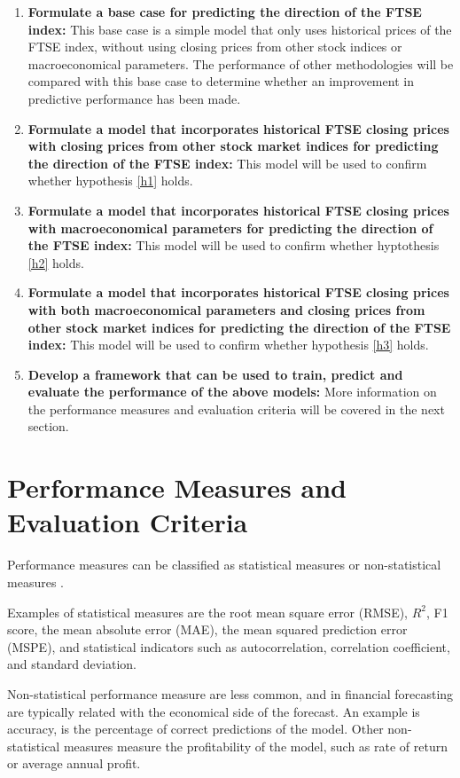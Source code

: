 \documentclass{UoYCSproject}
\begin{document}
\begin{enumerate}
    \item \label{basecase} \textbf{Formulate a base case for predicting the direction of the FTSE index:} This base case is a simple model that only uses historical prices of the FTSE index, without using closing prices from other stock indices or macroeconomical parameters. The performance of other methodologies will be compared with this base case to determine whether an improvement in predictive performance has been made.  
    \item \textbf{Formulate a model that incorporates historical FTSE closing prices with closing prices from other stock market indices for predicting the direction of the FTSE index:} This model will be used to confirm whether hypothesis \ref{h1} holds.
    \item \textbf{Formulate a model that incorporates historical FTSE closing prices with macroeconomical parameters for predicting the direction of the FTSE index:} This model will be used to confirm whether hyptothesis \ref{h2} holds.
    \item \textbf{Formulate a model that incorporates historical FTSE closing prices with both macroeconomical parameters and closing prices from other stock market indices for predicting the direction of the FTSE index:} This model will be used to confirm whether hypothesis \ref{h3} holds.
    \item \label{framework} \textbf{Develop a framework that can be used to train, predict and evaluate the performance of the above models:} More information on the performance measures and evaluation criteria will be covered in the next section. 
\end{enumerate}

\section{Performance Measures and Evaluation Criteria}
Performance measures can be classified as statistical measures or non-statistical measures \cite{atsalakis2009surveying}.

Examples of statistical measures are the root mean square error (RMSE), $R^2$, F1 score, the mean absolute error (MAE), the mean squared prediction error (MSPE), and statistical indicators such as autocorrelation, correlation coefficient, and standard deviation. 

Non-statistical performance measure are less common, and in financial forecasting are typically related with the economical side of the forecast. An example is accuracy, is the percentage of correct predictions of the model. Other non-statistical measures measure the profitability of the model, such as rate of return or average annual profit.
\end{document}
